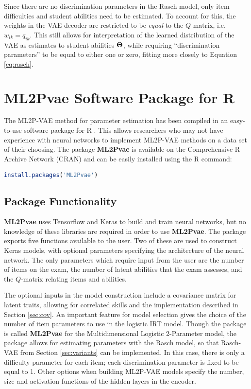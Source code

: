 Since there are no discrimination parameters in the Rasch model, only item difficulties and student abilities need to be estimated. To account for this, the weights in the VAE decoder are restricted to be \textit{equal} to the $Q$-matrix, i.e. $w_{ik} = q_{ik}$. This still allows for interpretation of the learned distribution of the VAE as estimates to student abilities $\boldsymbol{\Theta}$, while requiring ``discrimination parameters'' to be equal to either one or zero, fitting more closely to Equation \ref{eq:rasch}.

%
\section{\textbf{ML2Pvae} Software Package for R}
The ML2P-VAE method for parameter estimation has been compiled in an easy-to-use software package for R \cite{r_package}. This allows researchers who may not have experience with neural networks to implement ML2P-VAE methods on a data set of their choosing. The package \textbf{ML2Pvae} is available on the Comprehensive R Archive Network (CRAN) and can be easily installed using the R command:
\begin{lstlisting}[language=R, numbers=none]
install.packages('ML2Pvae')
\end{lstlisting}

\subsection{Package Functionality}
\textbf{ML2Pvae} uses Tensorflow and Keras to build and train neural networks, but no knowledge of these libraries are required in order to use \textbf{ML2Pvae}. The package exports five functions available to the user. Two of these are used to construct Keras models, with optional parameters specifying the architecture of the neural network. The only parameters which require input from the user are the number of items on the exam, the number of latent abilities that the exam assesses, and the $Q$-matrix relating items and abilities.

The optional inputs in the model construction include a covariance matrix for latent traits, allowing for correlated skills and the implementation described in Section \ref{sec:cov}. An important feature for model selection gives the choice of the number of item parameters to use in the logistic IRT model. Though the package is called \textbf{ML2Pvae} for the Multidimensional Logistic 2-Parameter model, the package allows for estimating parameters with the Rasch model, so that Rasch-VAE from Section \ref{sec:variants} can be implemented. In this case, there is only a difficulty parameter for each item; each  discrimination parameter is fixed to be equal to 1. Other options when building ML2P-VAE models specify the number, size and activation functions of the hidden layers in the encoder.

